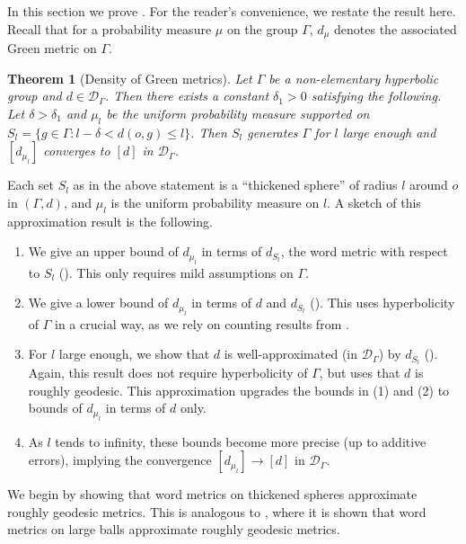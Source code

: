 \documentclass[twoside]{amsart}
\newtheorem{theorem}{Theorem}[section]
\theoremstyle{definition}
\numberwithin{equation}{section}
\numberwithin{theorem}{section}
\newcommand{\calD}{\mathcal{D}}
\newcommand{\scrD}{\mathscr{D}}
\newcommand{\G}{\Gamma}
\newcommand{\del}{\delta}
\newcommand{\m}{\mu}
\begin{document}
In this section we prove .  For the reader's convenience, we restate the result here. Recall that for a probability measure $\mu$ on the group $\G$, $d_\mu$ denotes the associated Green metric on $\G$.

\begin{theorem}[Density of Green metrics]\label{thm.greendense}
    Let $\G$ be a non-elementary hyperbolic group and $d\in \calD_\G$. Then there exists a constant $\del_1>0$ satisfying the following. Let $\del>\del_1$ and $\mu_l$ be the uniform probability measure supported on $S_l=\{g\in \G \colon l-\del<d(o,g)\leq l\}$. Then $S_l$ generates $\G$ for $l$ large enough and $[d_{\mu_l}]$ converges to $[d]$ in $\scrD_\G$.
\end{theorem}

Each set $S_l$ as in the above statement is a ``thickened sphere'' of radius $l$ around $o$ in $(\G,d)$, and $\m_l$ is the uniform probability measure on $l$. A sketch of this  approximation result is the following. 
\begin{enumerate}
    \item We give an upper bound of $d_{\mu_l}$ in terms of $d_{S_l}$, the word metric with respect to $S_l$ (). This only requires mild assumptions on $\G$.
    \item We give a lower bound of $d_{\mu_l}$ in terms of $d$ and $d_{S_l}$ (). This uses hyperbolicity of $\G$ in a crucial way, as we rely on counting results from \cite{CDS}. 
    \item For $l$ large enough, we show that $d$ is well-approximated (in $\scrD_\G$) by $d_{S_l}$ (). Again, this result does not require hyperbolicity of $\G$, but uses that $d$ is roughly geodesic. This approximation upgrades the bounds in (1) and (2) to bounds of $d_{\mu_l}$ in terms of $d$ only. 
    \item As $l$ tends to infinity, these bounds become more precise (up to additive errors), implying the convergence $[d_{\mu_l}]\to [d]$ in $\scrD_\G$. 
\end{enumerate}

We begin by showing that word metrics on thickened spheres approximate roughly geodesic metrics. This is analogous to \cite[Lemma~2.5~(2)]{cantrell-reyes.approx}, where it is shown that word metrics on large balls approximate roughly geodesic metrics.
\end{document}
